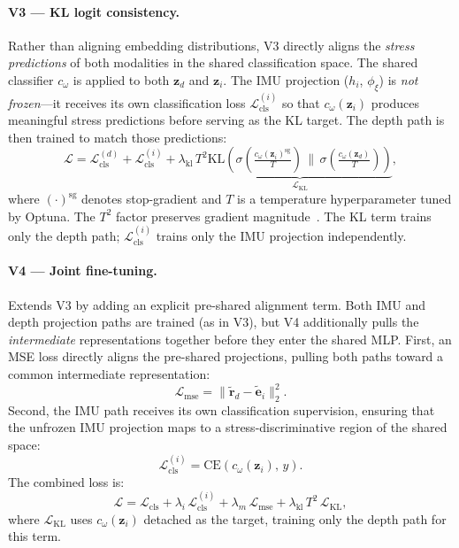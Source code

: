 \documentclass[sigconf,anonymous=false]{acmart}
\begin{document}
\paragraph{V3 --- KL logit consistency.}
Rather than aligning embedding distributions, V3 directly aligns the
\emph{stress predictions} of both modalities in the shared classification
space.  The shared classifier $c_\omega$ is applied to both $\mathbf{z}_d$
and $\mathbf{z}_i$.  The IMU projection ($h_i$, $\phi_\xi$) is \emph{not
frozen}---it receives its own classification loss $\mathcal{L}_\text{cls}^{(i)}$
so that $c_\omega(\mathbf{z}_i)$ produces meaningful stress predictions before
serving as the KL target.  The depth path is then trained to match those
predictions:
\begin{equation}
  \mathcal{L} = \mathcal{L}_\text{cls}^{(d)}
              + \mathcal{L}_\text{cls}^{(i)}
              + \lambda_\text{kl}\,T^2\underbrace{
              \mathrm{KL}\!\left(
                \sigma\!\!\left(\tfrac{c_\omega(\mathbf{z}_i)^\text{sg}}{T}\right)
                \,\Big\|\,
                \sigma\!\!\left(\tfrac{c_\omega(\mathbf{z}_d)}{T}\right)
              \right)}_{\mathcal{L}_\text{KL}},
  \label{eq:v3}
\end{equation}
where $(\cdot)^\text{sg}$ denotes stop-gradient and $T$ is a temperature
hyperparameter tuned by Optuna.
The $T^2$ factor preserves gradient magnitude~\cite{hinton2015distilling}.
The KL term trains only the depth path; $\mathcal{L}_\text{cls}^{(i)}$
trains only the IMU projection independently.

\paragraph{V4 --- Joint fine-tuning.}
Extends V3 by adding an explicit pre-shared alignment term.
Both IMU and depth projection paths are trained (as in V3), but V4
additionally pulls the \emph{intermediate} representations together
before they enter the shared MLP.
First, an MSE loss directly aligns the pre-shared projections, pulling
both paths toward a common intermediate representation:
\begin{equation}
  \mathcal{L}_\text{mse} = \|\tilde{\mathbf{r}}_d - \tilde{\mathbf{e}}_i\|_2^2.
  \label{eq:mse}
\end{equation}
Second, the IMU path receives its own classification supervision, ensuring
that the unfrozen IMU projection maps to a stress-discriminative region of
the shared space:
\begin{equation}
  \mathcal{L}_\text{cls}^{(i)} = \text{CE}(c_\omega(\mathbf{z}_i),\, y).
  \label{eq:cls_imu}
\end{equation}
The combined loss is:
\begin{equation}
  \mathcal{L} = \mathcal{L}_\text{cls}
              + \lambda_i\,\mathcal{L}_\text{cls}^{(i)}
              + \lambda_m\,\mathcal{L}_\text{mse}
              + \lambda_\text{kl}\,T^2\,\mathcal{L}_\text{KL},
  \label{eq:v4}
\end{equation}
where $\mathcal{L}_\text{KL}$ uses $c_\omega(\mathbf{z}_i)$ detached as
the target, training only the depth path for this term.
\end{document}
